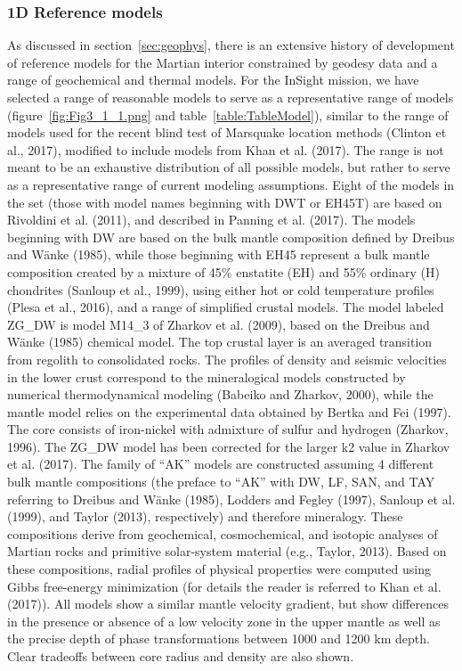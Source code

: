 \subsubsection{1D Reference models}

As discussed in section~\ref{sec:geophys}, there is an extensive history of development of reference models for the Martian interior constrained by geodesy data and a range of geochemical and thermal models.  For the InSight mission, we have selected a range of reasonable models to serve as a representative range of models (figure~\ref{fig:Fig3_1_1.png} and table~\ref{table:TableModel}), similar to the range of models used for the recent blind test of Marsquake location methods (Clinton et al., 2017), modified to include models from Khan et al. (2017). The range is not meant to be an exhaustive distribution of all possible models, but rather to serve as a representative range of current modeling assumptions.  Eight of the models in the set (those with model names beginning with DWT or EH45T) are based on Rivoldini et al. (2011), and described in Panning et al. (2017).  The models beginning with DW are based on the bulk mantle composition defined by Dreibus and W\"{a}nke (1985), while those beginning with EH45 represent a bulk mantle composition created by a mixture of 45\% enstatite (EH) and 55\% ordinary (H) chondrites (Sanloup et al., 1999), using either hot or cold temperature profiles (Plesa et al., 2016), and a range of simplified crustal models.  The model labeled ZG\_DW is model M14\_3 of Zharkov et al. (2009), based on the Dreibus and W\"{a}nke (1985) chemical model. The top crustal layer is an averaged transition from regolith to consolidated rocks. The profiles of density and seismic velocities in the lower crust correspond to the mineralogical models constructed by numerical thermodynamical modeling (Babeiko and Zharkov, 2000), while the mantle model relies on the experimental data obtained by Bertka and Fei (1997). The core consists of iron-nickel with admixture of sulfur and hydrogen (Zharkov, 1996). The ZG\_DW model has been corrected for the larger k2 value in Zharkov et al. (2017).  The family of ``AK'' models are constructed assuming 4 different bulk mantle compositions (the preface to ``AK'' with DW, LF,  SAN, and TAY referring to Dreibus and W\"{a}nke (1985), Lodders and Fegley (1997), Sanloup et al. (1999), and Taylor (2013), respectively) and therefore mineralogy. These compositions derive from geochemical, cosmochemical, and isotopic analyses of Martian rocks and primitive solar-system material (e.g., Taylor, 2013). Based on these compositions, radial profiles of physical properties were computed using Gibbs free-energy minimization (for details the reader is referred to Khan et al. (2017)).  All models show a similar mantle velocity gradient, but show differences in the presence or absence of a low velocity zone in the upper mantle as well as the precise depth of phase transformations between 1000 and 1200 km depth.  Clear tradeoffs between core radius and density are also shown.

